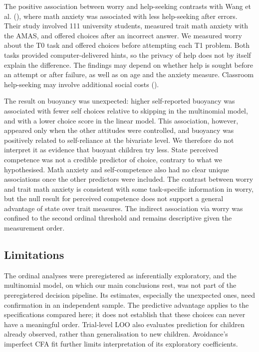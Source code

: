 \documentclass[
  man,
  floatsintext,
  longtable,
  nolmodern,
  notxfonts,
  notimes,
  colorlinks=true,linkcolor=blue,citecolor=blue,urlcolor=blue]{apa7}
\begin{document}
The positive association between worry and help-seeking contrasts with
Wang et al. (), where math anxiety was
associated with less help-seeking after errors. Their study involved 111
university students, measured trait math anxiety with the AMAS, and
offered choices after an incorrect answer. We measured worry about the
T0 task and offered choices before attempting each T1 problem. Both
tasks provided computer-delivered hints, so the privacy of help does not
by itself explain the difference. The findings may depend on whether
help is sought before an attempt or after failure, as well as on age and
the anxiety measure. Classroom help-seeking may involve additional
social costs ().

The result on buoyancy was unexpected: higher self-reported buoyancy was
associated with fewer self choices relative to skipping in the
multinomial model, and with a lower choice score in the linear model.
This association, however, appeared only when the other attitudes were
controlled, and buoyancy was positively related to self-reliance at the
bivariate level. We therefore do not interpret it as evidence that
buoyant children try less. State perceived competence was not a credible
predictor of choice, contrary to what we hypothesised. Math anxiety and
self-competence also had no clear unique associations once the other
predictors were included. The contrast between worry and trait math
anxiety is consistent with some task-specific information in worry, but
the null result for perceived competence does not support a general
advantage of state over trait measures. The indirect association via
worry was confined to the second ordinal threshold and remains
descriptive given the measurement order.

\subsection{Limitations}\label{limitations}

The ordinal analyses were preregistered as inferentially exploratory,
and the multinomial model, on which our main conclusions rest, was not
part of the preregistered decision pipeline. Its estimates, especially
the unexpected ones, need confirmation in an independent sample. The
predictive advantage applies to the specifications compared here; it
does not establish that these choices can never have a meaningful order.
Trial-level LOO also evaluates prediction for children already observed,
rather than generalisation to new children. Avoidance's imperfect CFA
fit further limits interpretation of its exploratory coefficients.
\end{document}
